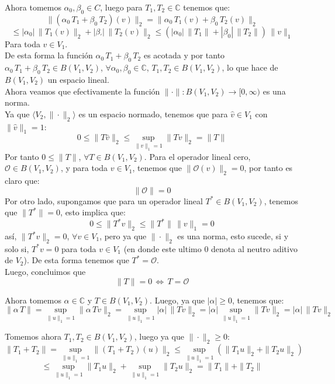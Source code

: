 \documentclass[12pt]{book}
\numberwithin{equation}{chapter}
\def\n{\noindent}
\def\C{\mathbb{C}}
\def\la{\langle}
\def\ra{\rangle}
\def\rar{\rightarrow}
\def\sss{\Leftrightarrow}
\begin{document}
Ahora tomemos $ \alpha_{0},\beta_{0} \in C $, luego para $T_{1},T_{2} \in \C$ tenemos que:
$$ \| (\alpha_{0}\,T_{1}+\beta_{0}\,T_{2} )(v) \|_{2}=\|\alpha_{0}\,T_{1}(v) + \beta_{0}\,T_{2}(v) \|_{2}$$ 
$$\leq |\alpha_{0}|\, \| T_{1}(v) \|_{2} + |\beta_{'}| \, \|T_{2}(v)\|_{2} \leq (|\alpha_{0}|\, \| T_{1} \| + |\beta_{0}| \, \|T_{2}\|) \, \|v\|_{1} $$
Para toda $v \in V_{1}$.\\ 
De esta forma la funci\'on $\alpha_{0}\,T_{1}+\beta_{0}\,T_{2} $ es acotada y por tanto $\alpha_{0}\,T_{1}+\beta_{0}\,T_{2} \in B(V_{1},V_{2})$, $ \forall \alpha_{0},\beta_{0} \in \C$, $ T_{1}, T_{2} \in B(V_{1},V_{2})$, lo que hace de $B(V_{1},V_{2})$ un espacio lineal.\\

\n Ahora veamos que efectivamente la funci\'on $\| \cdot \| : B(V_{1},V_{2}) \rar [0,\infty)$ es una norma.\\

\n Ya que $\la V_{2},\| \cdot \|_{2} \ra$ es un espacio normado, tenemos que para $ \hat{v} \in V_{1} $ con $ \| \hat{v} \|_{1}=1 $:
$$ 0 \leq \| T\hat{v} \|_{2} \leq \sup_{\|v\|_{1}=1} \|Tv\|_{2}=\|T\| $$
Por tanto $ 0 \leq \|T\| $, $ \forall T \in B(V_{1},V_{2}) $. Para el operador lineal cero, $\mathcal{O} \in B(V_{1},V_{2})$, y para toda $v \in V_{1}$, tenemos que $ \| \mathcal{O}(v) \|_{2}=0 $, por tanto es claro que:
$$ \| \mathcal{O} \|=0 $$
Por otro lado, supongamos que para un operador lineal $ T^{*} \in B(V_{1},V_{2}) $, tenemos que $ \|T^{*}\|=0 $, esto implica que:
$$ 0 \leq \| T^{*}v \|_{2} \leq \| T^{*} \| \, \|v\|_{1}=0 $$
as\'i, $\| T^{*}v \|_{2}=0$, $\forall v \in V_{1}$, pero ya que $\| \cdot \|_{2}$ es una norma, esto sucede, si y solo si, $ T^{*}v =0$ para toda $v \in V_{1}$ (en donde este ultimo $0$ denota al neutro aditivo de $V_{2}$). De esta forma tenemos que $T^{*}= \mathcal{O}$.\\
Luego, concluimos que
$$ \| T \|=0 \, \sss \, T=\mathcal{O} $$

\n Ahora tomemos $\alpha \in \C$ y $T \in B(V_{1},V_{2})$. Luego, ya que $|\alpha| \geq 0$, tenemos que:
$$ \| \alpha \,T \|= \sup_{\|u\|_{1}=1}\| \alpha \, Tv \|_{2}= \sup_{\|u\|_{1}=1}|\alpha|\, \|Tv \|_{2} = |\alpha| \, \sup_{\|u\|_{1}=1} \|Tv \|_{2} = |\alpha|\, \|Tv\|_{2} $$

\n Tomemos ahora $T_{1},T_{2} \in B(V_{1},V_{2})$, luego ya que $\| \cdot \|_{2} \geq 0$:
$$ \| T_{1}+T_{2} \|= \sup_{\|u\|_{1}=1} \| (T_{1}+T_{2})(u) \|_{2} \leq \sup_{\|u\|_{1}=1} (\|T_{1}u\|_{2} + \|T_{2}u\|_{2}) $$
$$ \leq \sup_{\|u\|_{1}=1} \|T_{1}u\|_{2} + \sup_{\|u\|_{1}=1} \|T_{2}u\|_{2} =\|T_{1}\| + \|T_{2}\| $$
\end{document}
